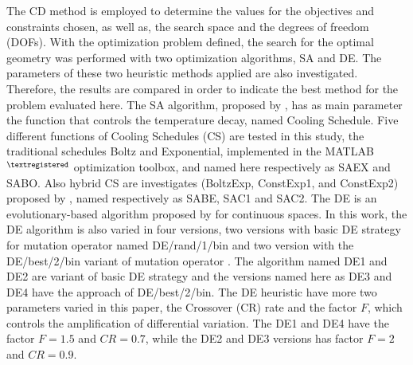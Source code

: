 \documentclass[12pt,fleqn]{article}
\begin{document}
The CD method is employed to determine the values for the  objectives and constraints chosen, as well as, the search space and the degrees of freedom (DOFs). With the optimization problem defined, the search for the optimal geometry was performed with two optimization algorithms, SA and DE. The parameters of these two heuristic methods applied are also investigated. Therefore, the results are compared in order to indicate the best method for the problem evaluated here. The SA algorithm, proposed by \cite{Kirkpatrick1983}, has as main parameter the function that controls the temperature decay, named Cooling Schedule. Five different functions of Cooling Schedules (CS) are tested in this study, the traditional schedules Boltz and Exponential, implemented in the MATLAB$^{\tiny ®}$ optimization toolbox, and named here respectively as SAEX and SABO. Also hybrid CS are investigates (BoltzExp, ConstExp1, and ConstExp2) proposed by \cite{Gonzales2015b, Gonzales2015a}, named respectively as SABE, SAC1 and SAC2. The DE is an evolutionary-based algorithm proposed by \cite{Storn1997} for continuous spaces. In this work, the DE algorithm is also varied in four versions, two versions with basic DE strategy for mutation operator named DE/rand/1/bin and two version with the DE/best/2/bin variant of mutation operator \citep{Storn1997}. The algorithm named DE1 and DE2 are variant of basic DE strategy and the versions named here as DE3 and DE4 have the approach of  DE/best/2/bin. The DE heuristic have more two parameters varied in this paper, the Crossover (CR) rate and the factor $F$, which controls the amplification of differential variation. The DE1 and DE4 have the factor $F=1.5$ and $CR=0.7$, while the DE2 and DE3 versions has factor $F=2$ and $CR=0.9$.
\end{document}
